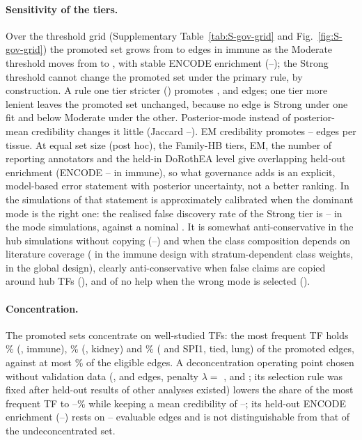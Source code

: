 \paragraph{Sensitivity of the tiers.}
Over the threshold grid (Supplementary Table~\ref{tab:S-gov-grid} and Fig.~\ref{fig:S-gov-grid}) the promoted set grows from \nGovQmImmMin{} to \nGovQmImmMax{} edges in immune as the Moderate threshold moves from \nGovQmGridMin{} to \nGovQmGridMax{}, with stable ENCODE enrichment (\nGovQmOeImmMin{}--\nGovQmOeImmMax{}); the Strong threshold cannot change the promoted set under the primary rule, by construction.
A rule one tier stricter () promotes \nGovStrictImm{}, \nGovStrictKid{} and \nGovStrictLung{} edges; one tier more lenient leaves the promoted set unchanged, because no edge is Strong under one fit and below Moderate under the other.
Posterior-mode instead of posterior-mean credibility changes it little (Jaccard \nGovMapJMin{}--\nGovMapJMax{}).
EM credibility promotes \nGovEmNMin{}--\nGovEmNMax{} edges per tissue.
At equal set size (post hoc), the Family-HB tiers, EM, the number of reporting annotators and the held-in DoRothEA level give overlapping held-out enrichment (ENCODE \nGovSmEncImmMin{}--\nGovSmEncImmMax{} in immune), so what governance adds is an explicit, model-based error statement with posterior uncertainty, not a better ranking.
In the simulations of  that statement is approximately calibrated when the dominant mode is the right one: the realised false discovery rate of the Strong tier is \nSimFdrRightMin{}--\nSimFdrRightMax{} in the mode simulations, against a nominal \nSimClaimed{}.
It is somewhat anti-conservative in the hub simulations without copying (\nSimHbFdrNoCopyMin{}--\nSimHbFdrNoCopyMax{}) and when the class composition depends on literature coverage (\nSimFdrStratImm{} in the immune design with stratum-dependent class weights, \nSimFdrStratGlob{} in the global design), clearly anti-conservative when false claims are copied around hub TFs (\nSimHbFdrCopy{}), and of no help when the wrong mode is selected (\nSimFdrWrong{}).

\paragraph{Concentration.}
The promoted sets concentrate on well-studied TFs: the most frequent TF holds \nGovTopImmPct{}\% (\nGovTopTfImm{}, immune), \nGovTopKidPct{}\% (\nGovTopTfKid{}, kidney) and \nGovTopLungPct{}\% (\nGovTopTfLung{} and SPI1, tied, lung) of the promoted edges, against at most \nGovTopEligBound{}\% of the eligible edges.
A deconcentration operating point chosen without validation data (\nDecBudgetImm{}, \nDecBudgetKid{} and \nDecBudgetLung{} edges, penalty $\lambda=$ \nDecAlphaImm{}, \nDecAlphaKid{} and \nDecAlphaLung{}; its selection rule was fixed after held-out results of other analyses existed) lowers the share of the most frequent TF to \nDecTopPctMin{}--\nDecTopPctMax{}\% while keeping a mean credibility of \nDecCredMin{}--\nDecCredMax{}; its held-out ENCODE enrichment (\nDecOeMin{}--\nDecOeMax{}) rests on \nDecNevalMin{}--\nDecNevalMax{} evaluable edges and is not distinguishable from that of the undeconcentrated set.


